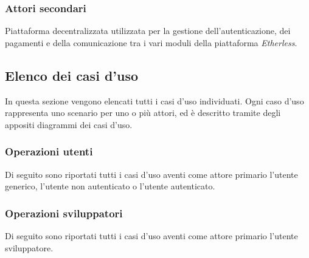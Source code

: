 	\subsubsection{Attori secondari}
		\begin{description}[style=nextline]
			\item[\textbf{Ethereum network}]
				Piattaforma decentralizzata utilizzata per la gestione dell'autenticazione, dei pagamenti e della comunicazione tra i vari moduli della piattaforma \textit{Etherless}. 
		\end{description}
	\pagebreak
\subsection{Elenco dei casi d'uso}
In questa sezione vengono elencati tutti i casi d'uso individuati. Ogni caso d'uso rappresenta uno scenario per uno o più attori, ed è descritto tramite degli appositi diagrammi dei casi d'uso. 

\subsubsection*{Operazioni utenti}
Di seguito sono riportati tutti i casi d'uso aventi come attore primario l'utente generico, l'utente non autenticato o l'utente autenticato. 



% 
% 
% 
% 

\subsubsection*{Operazioni sviluppatori}
Di seguito sono riportati tutti i casi d'uso aventi come attore primario l'utente sviluppatore.

% 
% 
% 
% 
% 
% 
